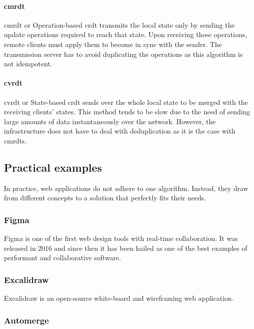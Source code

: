 \paragraph{\acrshort{cmrdt}}

\acrlong{cmrdt} or Operation-based \acrshort{crdt} transmits the local state only by sending the update operations required to reach that state.
Upon receiving these operations, remote clients must apply them to become in sync with the sender. The transmission server has to avoid duplicating the operations as this algorithm is not idempotent.

\paragraph{\acrshort{cvrdt}}

\acrlong{cvrdt} or State-based \acrshort{crdt} sends over the whole local state to be merged with the receiving clients' states. This method tends to be slow due to the need of sending large amounts of data instantaneously over the network. However, the infrastructure does not have to deal with deduplication as it is the case with \acrshort{cmrdt}s.

\subsection{Practical examples}

In practice, web applications do not adhere to one algorithm. Instead, they draw from different concepts to a solution that perfectly fits their needs.

\subsubsection{Figma}

Figma is one of the first web design tools with real-time collaboration.
It was released in 2016 and since then it has been hailed as one of the best examples of performant and collaborative software.



\subsubsection{Excalidraw}
Excalidraw is an open-source white-board and wireframing web application.

\subsubsection{Automerge}

